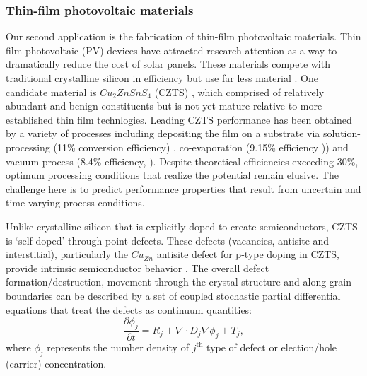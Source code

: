 \documentclass[11pt]{article}
\begin{document}
\subsubsection*{Thin-film photovoltaic materials}
Our second  application 
is the fabrication of thin-film photovoltaic
materials. 
Thin film photovoltaic (PV) devices have attracted research attention
as a way to dramatically reduce the cost of solar panels. These
materials compete with traditional crystalline silicon in efficiency but use far less
material \cite{JiangY13}. 
One candidate material is $Cu_2ZnSnS_4$ (CZTS) \cite{JiangY13}, which
comprised of relatively abundant and benign constituents but is not yet mature relative to more established thin film technlogies. 
Leading  CZTS  performance has been obtained by a variety of processes including depositing the film on a substrate via
solution-processing (11\% conversion efficiency) \cite{Todorov13},
co-evaporation (9.15\% efficiency \cite{Repins12})) and vacuum
process (8.4\% efficiency, \cite{Shin11}). Despite theoretical
efficiencies exceeding 30\%,  optimum processing conditions
that realize the potential remain elusive.
The challenge here is to 
predict performance properties that result from uncertain and time-varying process
conditions.

Unlike crystalline silicon that is explicitly doped
to create  semiconductors, CZTS is
`self-doped' through point defects.
These defects (vacancies, antisite and interstitial), particularly
the $Cu_{Zn}$ antisite defect for p-type doping in CZTS, provide intrinsic 
semiconductor behavior
\cite{JiangY13}. The overall defect formation/destruction, movement
through the crystal structure and along grain boundaries can be
described by a set of coupled stochastic partial differential
equations that treat the defects as continuum
quantities:
\begin{equation}
  \label{eq:pdpde}
  \frac{\partial \phi_j}{\partial t}  = R_j + \nabla \cdot  D_j \nabla \phi_j  + T_j,
\end{equation}
where $\phi_j$ represents the number density of $j^\mathrm{th}$ type
of defect or election/hole (carrier) concentration. 
\end{document}
